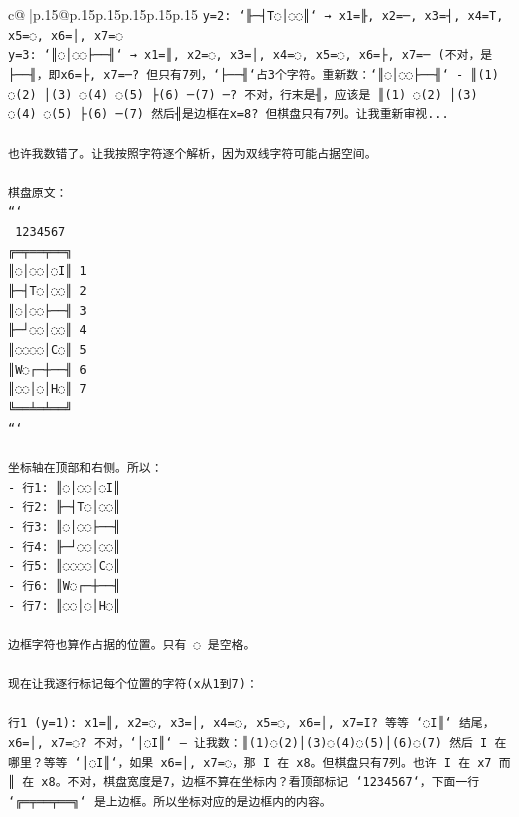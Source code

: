 \documentclass{article}
\begin{document}
{\begin{supertabular}{c@{$\;$}|p{.15\linewidth}@{}p{.15\linewidth}p{.15\linewidth}p{.15\linewidth}p{.15\linewidth}p{.15\linewidth}}
{{{\texttt{y=2: `╟─┤T◌│◌◌║` → x1=╟, x2=─, x3=┤, x4=T, x5=◌, x6=│, x7=◌} \\
\texttt{y=3: `║◌│◌◌├──╢` → x1=║, x2=◌, x3=│, x4=◌, x5=◌, x6=├, x7=─ (不对，是├──╢，即x6=├, x7=─? 但只有7列，`├──╢`占3个字符。重新数：`║◌│◌◌├──╢` {-} ║(1) ◌(2) │(3) ◌(4) ◌(5) ├(6) ─(7) ─? 不对，行末是╢，应该是 ║(1) ◌(2) │(3) ◌(4) ◌(5) ├(6) ─(7) 然后╢是边框在x=8? 但棋盘只有7列。让我重新审视...} \\
\\ 
\texttt{也许我数错了。让我按照字符逐个解析，因为双线字符可能占据空间。} \\
\\ 
\texttt{棋盘原文：} \\
\texttt{```} \\
\texttt{ 1234567} \\
\texttt{╔═╤══╤══╗} \\
\texttt{║◌│◌◌│◌I║ 1} \\
\texttt{╟─┤T◌│◌◌║ 2} \\
\texttt{║◌│◌◌├──╢ 3} \\
\texttt{╟─┘◌◌│◌◌║ 4} \\
\texttt{║◌◌◌◌│C◌║ 5} \\
\texttt{║W◌┌─┼──╢ 6} \\
\texttt{║◌◌│◌│H◌║ 7} \\
\texttt{╚══╧═╧══╝} \\
\texttt{```} \\
\\ 
\texttt{坐标轴在顶部和右侧。所以：} \\
\texttt{{-} 行1: ║◌│◌◌│◌I║} \\
\texttt{{-} 行2: ╟─┤T◌│◌◌║} \\
\texttt{{-} 行3: ║◌│◌◌├──╢} \\
\texttt{{-} 行4: ╟─┘◌◌│◌◌║} \\
\texttt{{-} 行5: ║◌◌◌◌│C◌║} \\
\texttt{{-} 行6: ║W◌┌─┼──╢} \\
\texttt{{-} 行7: ║◌◌│◌│H◌║} \\
\\ 
\texttt{边框字符也算作占据的位置。只有 ◌ 是空格。} \\
\\ 
\texttt{现在让我逐行标记每个位置的字符(x从1到7)：} \\
\\ 
\texttt{行1 (y=1): x1=║, x2=◌, x3=│, x4=◌, x5=◌, x6=│, x7=I? 等等 `◌I║` 结尾，x6=│, x7=◌? 不对，`│◌I║` — 让我数：║(1)◌(2)│(3)◌(4)◌(5)│(6)◌(7) 然后 I 在哪里？等等 `│◌I║`，如果 x6=│, x7=◌，那 I 在 x8。但棋盘只有7列。也许 I 在 x7 而 ║ 在 x8。不对，棋盘宽度是7，边框不算在坐标内？看顶部标记 `1234567`，下面一行 `╔═╤══╤══╗` 是上边框。所以坐标对应的是边框内的内容。} \\
}}}
\end{supertabular}}
\end{document}
